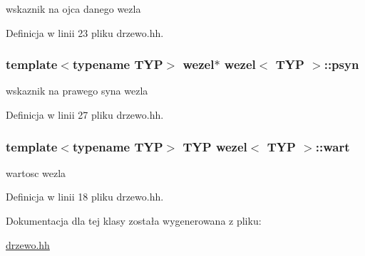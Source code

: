 wskaznik na ojca danego wezla 



\-Definicja w linii 23 pliku drzewo.\-hh.

\hypertarget{classwezel_ad11efeb4a2370777c00dce1ad6cd6431}{
\subsubsection[{psyn}]{\setlength{\rightskip}{0pt plus 5cm}template$<$typename \-T\-Y\-P$>$ {\bf wezel}$\ast$ {\bf wezel}$<$ \-T\-Y\-P $>$\-::{\bf psyn}}}\label{classwezel_ad11efeb4a2370777c00dce1ad6cd6431}


wskaznik na prawego syna wezla 



\-Definicja w linii 27 pliku drzewo.\-hh.

\hypertarget{classwezel_a40046e679b18d040aaaacd2beccf7fed}{
\subsubsection[{wart}]{\setlength{\rightskip}{0pt plus 5cm}template$<$typename \-T\-Y\-P$>$ \-T\-Y\-P {\bf wezel}$<$ \-T\-Y\-P $>$\-::{\bf wart}}}\label{classwezel_a40046e679b18d040aaaacd2beccf7fed}


wartosc wezla 



\-Definicja w linii 18 pliku drzewo.\-hh.



\-Dokumentacja dla tej klasy została wygenerowana z pliku\-:\begin{DoxyCompactItemize}
\item 
\hyperlink{drzewo_8hh}{drzewo.\-hh}\end{DoxyCompactItemize}
